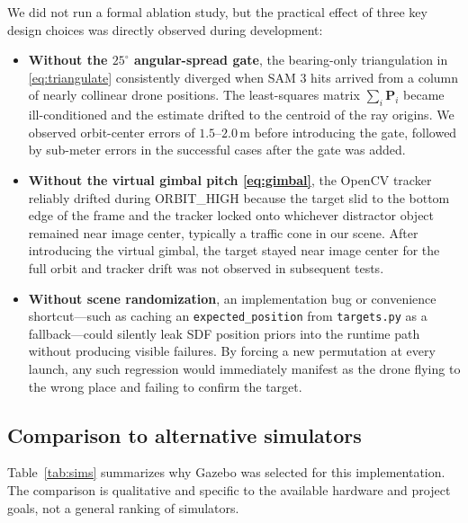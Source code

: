 \documentclass[conference]{IEEEtran}
\begin{document}
We did not run a formal ablation study, but the practical effect of
three key design choices was directly observed during development:
\begin{itemize}
    \item \textbf{Without the $25^{\circ}$ angular-spread gate},
    the bearing-only triangulation in \eqref{eq:triangulate}
    consistently diverged when SAM 3 hits arrived from a column of
    nearly collinear drone positions. The least-squares matrix
    $\sum_i \mathbf{P}_i$ became ill-conditioned and the estimate
    drifted to the centroid of the ray origins. We observed
    orbit-center errors of $1.5$--$2.0$\,m before introducing the
    gate, followed by sub-meter errors in the successful cases after
    the gate was added.
    \item \textbf{Without the virtual gimbal pitch
    \eqref{eq:gimbal}}, the OpenCV tracker reliably drifted during
    ORBIT\_HIGH because the target slid to the bottom edge of the
    frame and the tracker locked onto whichever distractor object
    remained near image center, typically a traffic cone in our scene.
    After introducing the virtual gimbal, the target stayed near
    image center for the full orbit and tracker drift was not observed
    in subsequent tests.
    \item \textbf{Without scene randomization}, an implementation bug
    or convenience shortcut---such as caching an
    \texttt{expected\_position} from \texttt{targets.py} as a
    fallback---could silently leak SDF position priors into the
    runtime path without producing visible failures. By forcing a new
    permutation at every launch, any such regression would
    immediately manifest as the drone flying to the wrong place and
    failing to confirm the target.
\end{itemize}

\subsection{Comparison to alternative simulators}

Table~\ref{tab:sims} summarizes why Gazebo was selected for this
implementation. The comparison is qualitative and specific to the
available hardware and project goals, not a general ranking of
simulators.
\end{document}
